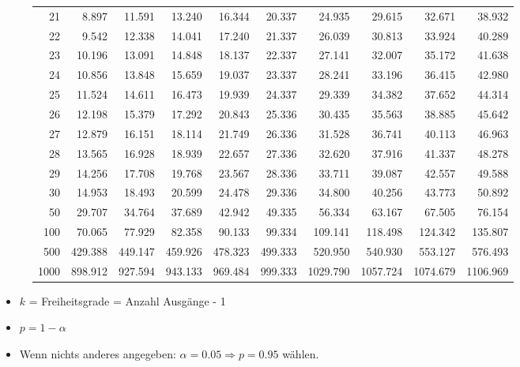 \begin{figure}[h!]
\begin{center}
\begin{tabular}{|r|rrr|rrr|rrr|}
21&8.897&11.591&13.240&16.344&20.337&24.935&29.615&32.671&38.932\\
22&9.542&12.338&14.041&17.240&21.337&26.039&30.813&33.924&40.289\\
23&10.196&13.091&14.848&18.137&22.337&27.141&32.007&35.172&41.638\\
24&10.856&13.848&15.659&19.037&23.337&28.241&33.196&36.415&42.980\\
25&11.524&14.611&16.473&19.939&24.337&29.339&34.382&37.652&44.314\\
26&12.198&15.379&17.292&20.843&25.336&30.435&35.563&38.885&45.642\\
27&12.879&16.151&18.114&21.749&26.336&31.528&36.741&40.113&46.963\\
28&13.565&16.928&18.939&22.657&27.336&32.620&37.916&41.337&48.278\\
29&14.256&17.708&19.768&23.567&28.336&33.711&39.087&42.557&49.588\\
30&14.953&18.493&20.599&24.478&29.336&34.800&40.256&43.773&50.892\\
50&29.707&34.764&37.689&42.942&49.335&56.334&63.167&67.505&76.154\\
100&70.065&77.929&82.358&90.133&99.334&109.141&118.498&124.342&135.807\\
500&429.388&449.147&459.926&478.323&499.333&520.950&540.930&553.127&576.493\\
1000&898.912&927.594&943.133&969.484&999.333&1029.790&1057.724&1074.679&1106.969\\
\hline
\end{tabular}
\end{center}
\end{figure}

\begin{itemize}
  \item $k$ = Freiheitsgrade = Anzahl Ausgänge - 1
  \item $p = 1 - \alpha$
  \item Wenn nichts anderes angegeben:
    $\alpha = 0.05 \Rightarrow p = 0.95$ wählen.
\end{itemize}

\pagebreak
